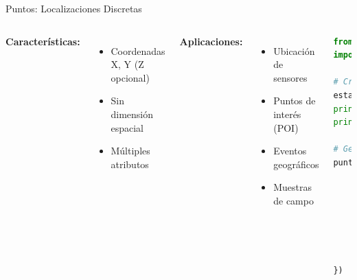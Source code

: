 \documentclass[10pt,aspectratio=169]{beamer}
\begin{document}
\begin{frame}[fragile]{Puntos: Localizaciones Discretas}
    \begin{columns}[T]
        \textbf{Características:}
        \begin{itemize}
            \item Coordenadas X, Y (Z opcional)
            \item Sin dimensión espacial
            \item Múltiples atributos
        \end{itemize}
        
        \textbf{Aplicaciones:}
        \begin{itemize}
            \item Ubicación de sensores
            \item Puntos de interés (POI)
            \item Eventos geográficos
            \item Muestras de campo
        \end{itemize}
        
        \begin{lstlisting}[language=Python]
from shapely.geometry import Point
import geopandas as gpd

# Crear punto
estacion = Point(-70.651, -33.438)
print(f"X: {estacion.x}")
print(f"Y: {estacion.y}")

# GeoDataFrame con puntos
puntos = gpd.GeoDataFrame({
    'id': [1, 2, 3],
    'tipo': ['sensor', 'muestra', 'POI'],
    'geometry': [
        Point(-70.651, -33.438),
        Point(-70.649, -33.437),
        Point(-70.652, -33.439)
    ]
})
        \end{lstlisting}
    \end{columns}
\end{frame}
\end{document}
